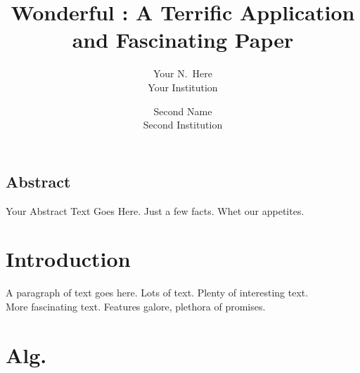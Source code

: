 \documentclass[letterpaper,twocolumn,10pt]{article}
\begin{document}
\date{}

\title{\Large \bf Wonderful : A Terrific Application and Fascinating Paper}

\author{
{\rm Your N.\ Here}\\
Your Institution
\and
{\rm Second Name}\\
Second Institution
}

\maketitle

\thispagestyle{empty}


\subsection*{Abstract}
Your Abstract Text Goes Here.  Just a few facts.
Whet our appetites.

\section{Introduction}

A paragraph of text goes here.  Lots of text.  Plenty of interesting
text. \\

More fascinating text. Features galore, plethora of promises.\\

\section{Alg.}
\end{document}

